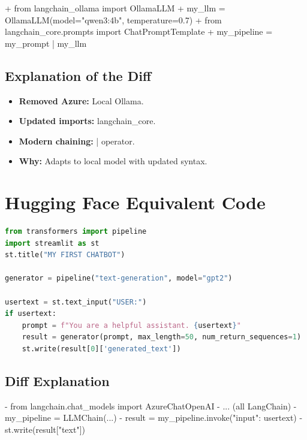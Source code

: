 \documentclass[11pt, a4paper]{article}
\begin{document}
\begin{addedcode}
\begin{diffverb}
+ from langchain_ollama import OllamaLLM
+ my_llm = OllamaLLM(model="qwen3:4b", temperature=0.7)
+ from langchain_core.prompts import ChatPromptTemplate
+ my_pipeline = my_prompt | my_llm
\end{diffverb}
\end{addedcode}


\subsection{Explanation of the Diff}
\begin{itemize}
    \item \textbf{Removed Azure:} Local Ollama.
    \item \textbf{Updated imports:} langchain\_core.
    \item \textbf{Modern chaining:} | operator.
    \item \textbf{Why:} Adapts to local model with updated syntax.
\end{itemize}

\section{Hugging Face Equivalent Code}
\begin{lstlisting}[language=Python]
from transformers import pipeline
import streamlit as st
st.title("MY FIRST CHATBOT")

generator = pipeline("text-generation", model="gpt2")

usertext = st.text_input("USER:")
if usertext:
    prompt = f"You are a helpful assistant. {usertext}"
    result = generator(prompt, max_length=50, num_return_sequences=1)
    st.write(result[0]['generated_text'])
\end{lstlisting}

\subsection{Diff Explanation}
\begin{removedcode}
\begin{diffverb}
- from langchain.chat_models import AzureChatOpenAI
- ... (all LangChain)
- my_pipeline = LLMChain(...)
- result = my_pipeline.invoke({"input": usertext})
- st.write(result["text"])
\end{diffverb}
\end{removedcode}
\end{document}
